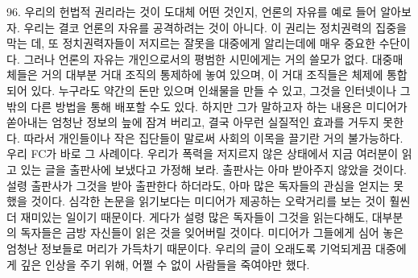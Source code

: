 \documentclass[11pt,a4paper]{article}
\begin{document}
\begin{multicols}{2}
96. 우리의 헌법적 권리라는 것이 도대체 어떤 것인지, 언론의 자유를 예로 들어 알아보자. 우리는 결코 언론의 자유를 공격하려는 것이 아니다. 이 권리는 정치권력의 집중을 막는 데, 또 정치권력자들이  저지르는 잘못을 대중에게 알리는데에 매우 중요한 수단이다. 그러나 언론의 자유는 개인으로서의  평범한 시민에게는 거의 쓸모가 없다. 대중매체들은 거의 대부분 거대 조직의 통제하에 놓여 있으며, 이  거대 조직들은 체제에 통합되어 있다. 누구라도 약간의 돈만 있으며 인쇄물을 만들 수 있고, 그것을  인터넷이나 그 밖의 다른 방법을 통해 배포할 수도 있다. 하지만 그가 말하고자 하는 내용은 미디어가  쏟아내는 엄청난 정보의 늪에 잠겨 버리고, 결국 아무런 실질적인 효과를 거두지 못한다. 따라서  개인들이나 작은 집단들이 말로써 사회의 이목을 끌기란 거의 불가능하다. 우리 FC가 바로 그 사례이다.  우리가 폭력을 저지르지 않은 상태에서 지금 여러분이 읽고 있는 글을 출판사에 보냈다고 가정해 보라.  출판사는 아마 받아주지 않았을 것이다. 설령 출판사가 그것을 받아 출판한다 하더라도, 아마 많은  독자들의 관심을 얻지는 못했을 것이다. 심각한 논문을 읽기보다는 미디어가 제공하는 오락거리를 보는  것이 훨씬 더 재미있는 일이기 때문이다. 게다가 설령 많은 독자들이 그것을 읽는다해도, 대부분의  독자들은 금방 자신들이 읽은 것을 잊어버릴 것이다. 미디어가 그들에게 심어 놓은 엄청난 정보들로 머리가 가득차기 때문이다. 우리의 글이 오래도록 기억되게끔 대중에게 깊은 인상을 주기 위해, 어쩔 수  없이 사람들을 죽여야만 했다.  



\end{multicols}
\end{document}
